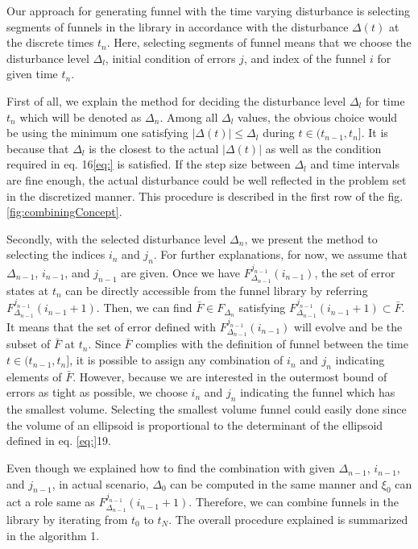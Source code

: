 \documentclass[letterpaper, 10 pt, conference]{ieeeconf}  %
\begin{document}
Our approach for generating funnel with the time varying disturbance is selecting segments of funnels in the library in accordance with the disturbance $\Delta(t)$ at the discrete times $t_n$.
Here, selecting segments of funnel means that we choose the disturbance level $\Delta_l$, initial condition of errors $j$, and index of the funnel $i$ for given time $t_n$.

First of all, we explain the method for deciding the disturbance level $\Delta_l$ for time $t_n$ which will be denoted as $\Delta_n$.
Among all $\Delta_l$ values, the obvious choice would be using the minimum one satisfying $|\Delta(t)| \leq \Delta_l$ during $t\in(t_{n-1},t_n]$. It is because that $\Delta_l$ is the closest to the actual $|\Delta(t)|$ as well as the condition required in eq. 16\eqref{eq:} is satisfied.
If the step size between $\Delta_l$ and time intervals are fine enough, the actual disturbance could be well reflected in the problem set in the discretized manner. 
This procedure is described in the first row of the fig. \ref{fig:combiningConcept}.

Secondly, with the selected disturbance level $\Delta_n$, we present the method to selecting the indices $i_n$ and $j_n$. For further explanations, for now, we assume that $\Delta_{n-1}$, $i_{n-1}$, and $j_{n-1}$ are given.
Once we have $F_{\Delta_{n-1}}^{j_{n-1}}(i_{n-1})$, the set of error states at $t_n$ can be directly accessible from the funnel library by referring $F_{\Delta_{n-1}}^{j_{n-1}}(i_{n-1}+1)$. 
Then, we can find $\bar{F} \in F_{\Delta_n}$ satisfying $F_{\Delta_{n-1}}^{j_{n-1}}(i_{n-1}+1) \subset \bar{F}$.
It means that the set of error defined with $F_{\Delta_{n-1}}^{j_{n-1}}(i_{n-1})$ will evolve and be the subset of $\bar{F}$ at $t_n$. Since $\bar{F}$ complies with the definition of funnel between the time $t\in(t_{n-1},t_n]$, it is possible to assign any combination of $i_n$ and $j_n$ indicating elements of $\bar{F}$.
However, because we are interested in the outermost bound of errors as tight as possible, we choose $i_n$ and $j_n$ indicating the funnel which has the smallest volume. Selecting the smallest volume funnel could easily done since the volume of an ellipsoid is proportional to the determinant of the ellipsoid defined in eq. \eqref{eq:}19. 

Even though we explained how to find the combination with given $\Delta_{n-1}$, $i_{n-1}$, and $j_{n-1}$, in actual scenario, $\Delta_0$ can be computed in the same manner and $\xi_0$ can act a role same as $F_{\Delta_{n-1}}^{j_{n-1}}(i_{n-1}+1)$.
Therefore, we can combine funnels in the library by iterating from $t_0$ to $t_N$.
The overall procedure explained is summarized in the algorithm 1.
\end{document}
